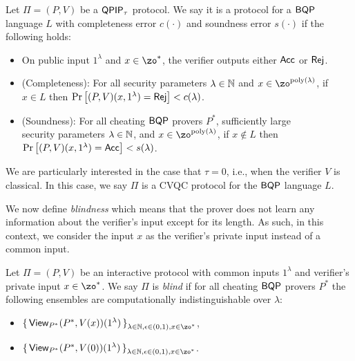 \begin{definition}
    Let $\Pi=(P, V)$ be a $\operatorname{\mathsf{QPIP}}_\tau$ protocol.
    We say it is a protocol for a $\operatorname{\mathsf{BQP}}$ language $L$ with completeness error $c(\cdot)$ and soundness error $s(\cdot)$ if the following holds:
\begin{itemize}
        \item On public input $1^\lambda$ and $x\in\zo^*$, the verifier outputs either $\mathsf{Acc}$ or $\mathsf{Rej}$.
        \item (Completeness): For all security parameters $\lambda\in\mathbb{N}$ and $x\in\zo^{\poly(\lambda)}$, if $x\in L$ then
        $\Pr\left[(P, V)(x, 1^\lambda)=\mathsf{Rej}\right]<c(\lambda)$.
        \item (Soundness): For all cheating $\operatorname{\mathsf{BQP}}$ provers $P^*$, sufficiently large \\security parameters $\lambda\in\mathbb{N}$, and $x\in\zo^{\poly(\lambda)}$, if $x \notin L$ then \\$\Pr\left[(P, V)(x, 1^\lambda)=\mathsf{Acc}\right]<s(\lambda)$.
    \end{itemize}
\end{definition}

We are particularly interested in the case that $\tau = 0$, i.e., when the verifier $V$ is classical. In this case, we say $\Pi$ is a CVQC protocol for the $\operatorname{\mathsf{BQP}}$ language $L$.

We now define \emph{blindness} which means that the prover does not learn any information about the verifier's input except for its length.
As such, in this context, we consider the input $x$ as the verifier's private input instead of a common input.  

\begin{definition}[Blindness]
    Let $\Pi=(P, V)$ be an interactive protocol with common inputs $1^\lambda$ 
    and verifier's private input $x\in\zo^*$.
    We say $\Pi$ is \emph{blind} if for all cheating $\operatorname{\mathsf{BQP}}$ provers $P^*$ the following ensembles are computationally indistinguishable over $\lambda$:
    \begin{itemize}
        \item $\set{\View_{P^*}(P^*, V(x))(1^\lambda)}_{\lambda\in\bbN, \eps\in(0,1), x\in\zo^*}$,
        \item $\set{\View_{P^*}(P^*, V(0))(1^\lambda)}_{\lambda\in\bbN, \eps\in(0,1), x\in\zo^*}$.
    \end{itemize}
\end{definition}

